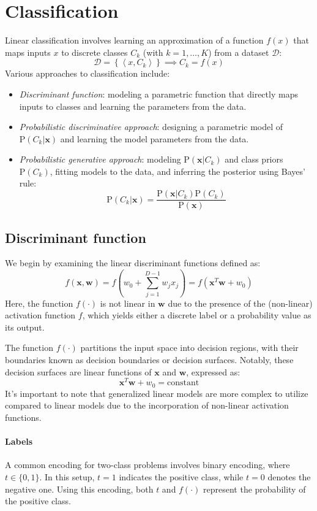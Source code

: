 \section{Classification}

Linear classification involves learning an approximation of a function $f(x)$ that maps inputs $x$  to discrete classes $C_k$ (with $k=1,\dots,K$) from a dataset $\mathcal{D}$: 
\[\mathcal{D}=\left\{ \left\langle x,C_k \right\rangle \right\} \implies C_k=f(x)\]
Various approaches to classification include:
\begin{itemize}
    \item \textit{Discriminant function}: modeling a parametric function that directly maps inputs to classes and learning the parameters from the data.
    \item \textit{Probabilistic discriminative approach}: designing a parametric model of $\text{P}(C_k|\textbf{x})$ and learning the model parameters from the data.
    \item \textit{Probabilistic generative approach}: modeling $\text{P}(\textbf{x}|C_k)$ and class priors $\text{P}(C_k)$, fitting models to the data, and inferring the posterior using Bayes' rule:
        \[\text{P}(C_k|\textbf{x})=\dfrac{\text{P}(\textbf{x}|C_k)\text{P}(C_k)}{\text{P}(\textbf{x})}\]
\end{itemize}

\subsection{Discriminant function}
We begin by examining the linear discriminant functions defined as:
\[f(\textbf{x},\textbf{w})=f\left( w_0+\sum_{j=1}^{D-1}w_jx_j \right)=f(\textbf{x}^T\textbf{w}+w_0)\]
Here, the function $f(\cdot)$ is not linear in $\textbf{w}$ due to the presence of the (non-linear) activation function $f$, which yields either a discrete label or a probability value as its output.

The function $f(\cdot)$ partitions the input space into decision regions, with their boundaries known as decision boundaries or decision surfaces.
Notably, these decision surfaces are linear functions of $\textbf{x}$ and $\textbf{w}$, expressed as:
\[\textbf{x}^T\textbf{w}+w_0=\text{constant}\]
It's important to note that generalized linear models are more complex to utilize compared to linear models due to the incorporation of non-linear activation functions.

\paragraph*{Labels}
A common encoding for two-class problems involves binary encoding, where $t \in \{0,1\}$. 
In this setup, $t=1$ indicates the positive class, while $t=0$ denotes the negative one.
Using this encoding, both $t$ and $f(\cdot)$ represent the probability of the positive class.

